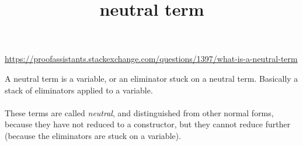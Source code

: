\documentclass{beamer}
\title{neutral term}
\date{}
\begin{document}
\begin{frame}
    \titlepage
\end{frame}

\begin{frame}
\url{https://proofassistants.stackexchange.com/questions/1397/what-is-a-neutral-term}

\vspace{10mm}
A neutral term is a variable, or an eliminator stuck on a neutral term. Basically a stack of eliminators applied to a variable.\\
~\\
These terms are called \textit{neutral}, and distinguished from other normal forms, because they have not reduced to a constructor, but they cannot reduce further (because the eliminators are stuck on a variable).
\end{frame}
\end{document}
